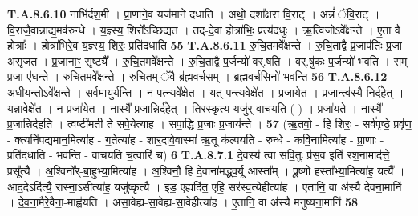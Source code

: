 \documentclass[17pt]{extarticle}
\begin{document}
                  \newline
                                                                  \textbf{ T.A.8.6.10} \newline
                  नाभि॑र्दश॒मी । प्रा॒णाने॒व यज॑माने दधाति । अथो॒ दशा᳚क्षरा वि॒राट् । अन्नं॑ ॅवि॒राट् । वि॒राजै॒वान्नाद्य॒मव॑रुन्धे । य॒ज्ञ्स्य॒ शिरो᳚ऽच्छिद्यत । तद्-दे॒वा होत्रा॑भिः॒ प्रत्य॑दधुः । ऋ॒त्विजोऽवे᳚क्षन्ते । ए॒ता वै होत्राः᳚ । होत्रा॑भिरे॒व य॒ज्ञ्स्य॒ शिरः॒ प्रति॑दधाति \textbf{ 55} \newline
                  \newline
                                                                  \textbf{ T.A.8.6.11} \newline
                  रु॒चि॒तमवे᳚क्षन्ते । रु॒चि॒ताद्वै प्र॒जाप॑तिः प्र॒जा अ॑सृजत । प्र॒जानाꣳ॒॒ सृष्ट्यै᳚ । रु॒चि॒तमवे᳚क्षन्ते । रु॒चि॒ताद्वै प॒र्जन्यो॑ वर्.षति । वर्.षु॑कः प॒र्जन्यो॑ भवति । सम् प्र॒जा ए॑धन्ते । रु॒चि॒तमवे᳚क्षन्ते । रु॒चि॒तम् ॅवै ब्र॑ह्मवर्च॒सम् । ब्र॒ह्म॒व॒र्च॒सिनो॑ भवन्ति \textbf{ 56} \newline
                  \newline
                                                                  \textbf{ T.A.8.6.12} \newline
                  अ॒धी॒यन्तोऽवे᳚क्षन्ते । सर्व॒मायु॑र्यन्ति । न पत्न्यवे᳚क्षेत । यत् पन्त्य॒वेक्षे॑त । प्रजा॑येत । प्र॒जान्त्व॑स्यै॒ निर्द॑हेत् । यन्नावेक्षे॑त । न प्रजा॑येत ।  नास्यै᳚ प्र॒जान्निर्द॑हेत् । ति॒र॒स्कृत्य॒ यजु॑र् वाचयति ( ) । प्रजा॑यते । नास्यै᳚ प्र॒जान्निर्द॑हति । त्वष्टी॑मती ते सपे॒येत्या॑ह । सपा॒द्धि प्र॒जाः प्र॒जाय॑न्ते । \textbf{ 57} \newline
                  \newline
                                                        (ऋ॒तवो॒ - हि शिरः॒ - सर्व॑पृष्ठे॒ प्रवृ॑ण॒ - क्त्यनि॑पद्यमान॒मित्या॑ह - ग॒तेत्या॑ह - शार॒दावे॒वास्मा॑ ऋ॒तू क॑ल्पयति - रुन्धे - कवि॒नामित्या॑ह - प्रा॒णाः - प्रति॑दधाति - भवन्ति - वाचयति च॒त्वारि॑ च) \textbf{6} \newline \newline
                                \textbf{ T.A.8.7.1} \newline
                  दे॒वस्य॑ त्वा सवि॒तुः प्र॑स॒व इति॑ रश॒नामाद॑त्ते॒ प्रसू᳚त्यै । अ॒श्विनो᳚र्-बा॒हुभ्या॒मित्या॑ह । अ॒श्विनौ॒ हि दे॒वाना॑मद्ध्व॒र्यू आस्ता᳚म् । पू॒ष्णो हस्ता᳚भ्या॒मित्या॑ह॒ यत्यै᳚ । आद॒देऽदि॑त्यै॒ रास्ना॒ऽसीत्या॑ह॒ यजु॑ष्कृत्यै । इड॒ एह्यदि॑त॒ एहि॒ सर॑स्व॒त्येहीत्या॑ह । ए॒तानि॒ वा अ॑स्यै देवना॒मानि॑ ।  दे॒व॒ना॒मैरे॒वैना॒-माह्व॑यति । असा॒वेह्य-सा॒वेह्य-सा॒वेहीत्या॑ह । ए॒तानि॒ वा अ॑स्यै मनुष्यना॒मानि॑ \textbf{ 58} \newline
\end{document}
